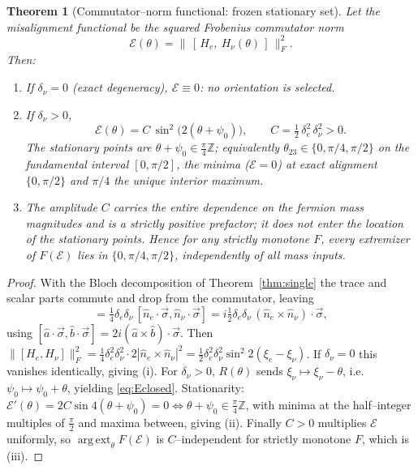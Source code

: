\documentclass[11pt,a4paper]{article}
\newtheorem{theorem}{Theorem}
\theoremstyle{definition}
\newcommand{\He}{H_e}
\newcommand{\Hnu}{H_\nu}
\newcommand{\Fnorm}[1]{\lVert #1 \rVert_F}
\DeclareMathOperator*{\argext}{arg\,ext}
\begin{document}
\begin{theorem}[Commutator--norm functional: frozen stationary set]\label{thm:nogo}
Let the misalignment functional be the squared Frobenius commutator norm
\begin{equation}
  \mathcal E(\theta)=\Fnorm{\,[\,\He,\ \Hnu(\theta)\,]\,}^2 .
\end{equation}
Then:
\begin{enumerate}
\item[(i)] If $\delta_\nu=0$ (exact degeneracy), $\mathcal E\equiv0$: no orientation
is selected.
\item[(ii)] If $\delta_\nu>0$,
\begin{equation}
  \boxed{\;\mathcal E(\theta)=C\,\sin^2\!\bigl(2(\theta+\psi_0)\bigr),
  \qquad C=\tfrac12\,\delta_e^2\,\delta_\nu^2>0.\;}
  \label{eq:Eclosed}
\end{equation}
The stationary points are $\theta+\psi_0\in\tfrac\pi4\mathbb Z$; equivalently
$\theta_{23}\in\{0,\pi/4,\pi/2\}$ on the fundamental interval $[0,\pi/2]$, the minima
($\mathcal E=0$) at exact alignment $\{0,\pi/2\}$ and $\pi/4$ the unique interior
maximum.
\item[(iii)] The amplitude $C$ carries the entire dependence on the fermion mass
magnitudes and is a strictly positive prefactor; it does not enter the location of
the stationary points. Hence for any strictly monotone $F$, every extremizer of
$F(\mathcal E)$ lies in $\{0,\pi/4,\pi/2\}$, independently of all mass inputs.
\end{enumerate}
\end{theorem}

\begin{proof}
With the Bloch decomposition of Theorem~\ref{thm:single} the trace and scalar
parts commute and drop from the commutator, leaving
\begin{equation}
  [\He,\Hnu]=\tfrac14\delta_e\delta_\nu\,[\hat n_e\!\cdot\!\vec\sigma,\hat n_\nu\!\cdot\!\vec\sigma]
  =i\tfrac12\delta_e\delta_\nu\,(\hat n_e\times\hat n_\nu)\!\cdot\!\vec\sigma,
\end{equation}
using $[\hat a\!\cdot\!\vec\sigma,\hat b\!\cdot\!\vec\sigma]=2i(\hat a\times\hat
b)\!\cdot\!\vec\sigma$. Then
$\Fnorm{[\He,\Hnu]}^2=\tfrac14\delta_e^2\delta_\nu^2\cdot2|\hat n_e\times\hat
n_\nu|^2=\tfrac12\delta_e^2\delta_\nu^2\sin^2 2(\xi_e-\xi_\nu)$. If $\delta_\nu=0$
this vanishes identically, giving (i). For $\delta_\nu>0$, $R(\theta)$ sends
$\xi_\nu\mapsto\xi_\nu-\theta$, i.e.\ $\psi_0\mapsto\psi_0+\theta$, yielding
\eqref{eq:Eclosed}. Stationarity:
$\mathcal E'(\theta)=2C\sin4(\theta+\psi_0)=0\iff\theta+\psi_0\in\tfrac\pi4\mathbb Z$,
with minima at the half--integer multiples of $\tfrac\pi2$ and maxima between,
giving (ii). Finally $C>0$ multiplies $\mathcal E$ uniformly, so
$\argext_\theta F(\mathcal E)$ is $C$--independent for strictly monotone $F$, which
is (iii).
\end{proof}
\end{document}
